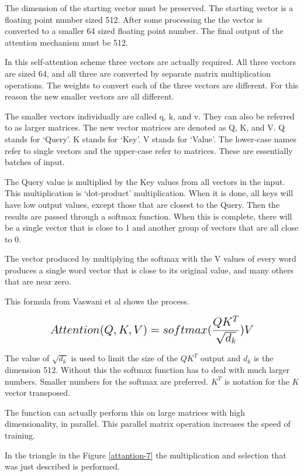 The dimension of the starting vector must be preserved. The starting vector is a floating point number sized 512. After some processing the the vector is converted to a smaller 64 sized floating point number. The final output of the attention mechanism must be 512. %

In this self-attention scheme three vectors are actually required. All three vectors are sized 64, and all three are converted by separate matrix multiplication operations. The weights to convert each of the three vectors are different. For this reason the new smaller vectors are all different.

The smaller vectors individually are called q, k, and v. They can also be referred to as larger matrices. The new vector matrices are denoted as Q, K, and V. Q stands for `Query'. K stands for `Key'. V stands for `Value'. The lower-case names refer to single vectors and the upper-case refer to matrices. These are essentially batches of input.

The Query value is multiplied by the Key values from all vectors in the input. This multiplication is `dot-product' multiplication. When it is done, all keys will have low output values, except those that are closest to the Query. Then the results are passed through a softmax function. When this is complete, there will be a single vector that is close to 1 and another group of vectors that are all close to 0.

The vector produced by multiplying the softmax with the V values of every word produces a single word vector that is close to its original value, and many others that are near zero.

This formula from Vaswani et al \cite{Vaswani2017AttentionIA} shows the process.

$$
\mathlarger{ \mathlarger{
Attention(Q,K,V)=softmax(\dfrac{QK^T}{\sqrt{d_k}})V
} }
$$

The value of $\sqrt{d_k}$ is used to limit the size of the $QK^T$ output and $d_k$ is the dimension 512. Without this the softmax function has to deal with much larger numbers. Smaller numbers for the softmax are preferred. $K^T$ is notation for the $K$ vector transposed.

The function can actually perform this on large matrices with high dimensionality, in parallel. This parallel matrix operation increases the speed of training.

In the triangle in the Figure \ref{attantion-7} the multiplication and selection that was just described is performed.

